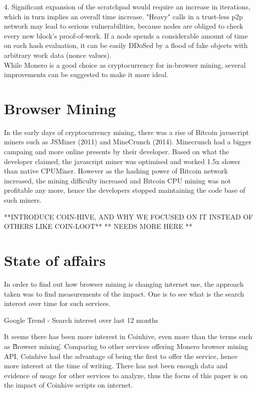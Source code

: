4. Significant expansion of the scratchpad would require an increase in iterations, which in turn implies an overall time increase. "Heavy" calls in a trust-less p2p network may lead to serious vulnerabilities, because nodes are obliged to check every new block's proof-of-work. If a node spends a considerable amount of time on each hash evaluation, it can be easily DDoSed by a flood of fake objects with arbitrary work data (nonce values).
\\
While Monero is a good choice as cryptocurrency for in-browser mining, several improvements can be suggested to make it more ideal. %


\section{Browser Mining}

In the early days of cryptocurrency mining, there was a rise of Bitcoin javascript miners such as JSMiner (2011) and MineCrunch (2014). Minecrunch had a bigger campaing and more online presents by their developer. Based on what the developer claimed, the javascript miner was optimised and worked 1.5x slower than native CPUMiner. However as the hashing power of Bitcoin network increased, the mining difficulty increased and Bitcoin CPU mining was not profitable any more, hence the developers stopped maintaining the code base of such miners.   

**INTRODUCE COIN-HIVE, AND WHY WE FOCUSED ON IT INSTEAD OF OTHERS LIKE COIN-LOOT**
** NEEDS MORE HERE ** 

\section{State of affairs}
In order to find out how browser mining is changing internet use, the approach taken was to find measurements of the impact. One is to see what is the search interest over time for such services. 

\begin{center}
	\caption{Google Trend - Search interest over last 12 months}
\end{center}

It seems there has been more interest in Coinhive, even more than the terms such as \`Browser mining\`. Comparing to other services offering Monero browser mining API, Coinhive had the advantage of being the first to offer the service, hence more interest at the time of writing. There has not been enough data and evidence of usage for other services to analyze, thus the focus of this paper is on the impact of Coinhive scripts on internet. 

